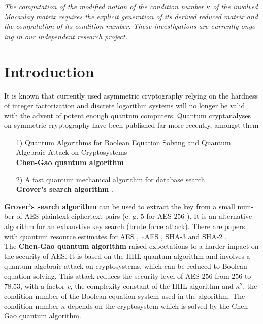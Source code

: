 \documentclass[a4paper,11pt]{article}
\begin{document}
\begin{otherlanguage}{english}
\noindent
\textit{The computation of the modified notion of the condition number $\kappa$ of the involved Macaulay matrix requires the explicit generation of its derived reduced matrix and the computation of its condition number. These investigations are currently ongoing in our independent research project. } \\



\section{Introduction}

\noindent
It is known that currently used asymmetric cryptography relying on the hardness of integer factorization and discrete logarithm systems will no longer be valid with the advent of potent enough quantum computers. Quantum cryptanalyses on symmetric cryptography have been published far more recently, amongst them \\

\begin{itemize} [noitemsep, nolistsep]
  \item[1)] Quantum Algorithms for Boolean Equation Solving and Quantum Algebraic Attack on Cryptosystems \\
  \textbf{Chen-Gao quantum algorithm} \cite{QAA}.
  \vspace{0.1cm}
  \item[2)] A fast quantum mechanical algorithm for database search \\
  \textbf{Grover’s search algorithm} \cite{GRV}.
  \vspace{0.1cm}
\end{itemize}
\vspace{0.5cm}

\noindent
\textbf{Grover’s search algorithm} can be used to extract the key from a small number of \textsc{AES} plaintext-ciphertext pairs (e. g. $5$ for \textsc{AES}-$256$ \cite{GRO}). It is an alternative algorithm for an exhaustive key search (brute force attack). There are papers with quantum resource estimates for \textsc{AES} \cite{GRO}, \textsc{eAES} \cite{KUN, CEX}, \textsc{SHA-3} \cite{QSH} and \textsc{SHA-2} \cite{QSH}. \\

\noindent
The \textbf{Chen-Gao quantum algorithm} raised expectations to a harder impact on the security of \textsc{AES}. It is based on the \textsc{HHL} quantum algorithm \cite{HHL} and involves a quantum algebraic attack on cryptosystems, which can be reduced to Boolean equation solving. This attack reduces the security level of \textsc{AES}-$256$ from $256$ to $78.53$, with a factor \textit{c}, the complexity constant of the \textsc{HHL} algorithm and $\kappa^2$, the condition number of the Boolean equation system used in the algorithm. The condition number $\kappa$ depends on the cryptosystem which is solved by the Chen-Gao quantum algorithm. \\


\end{otherlanguage}
\end{document}
